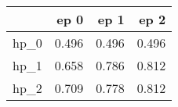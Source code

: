\begin{tabular}{lrrr}
\toprule
{} &   ep 0 &   ep 1 &   ep 2 \\
\midrule
hp\_0 &  0.496 &  0.496 &  0.496 \\
hp\_1 &  0.658 &  0.786 &  0.812 \\
hp\_2 &  0.709 &  0.778 &  0.812 \\
\bottomrule
\end{tabular}
